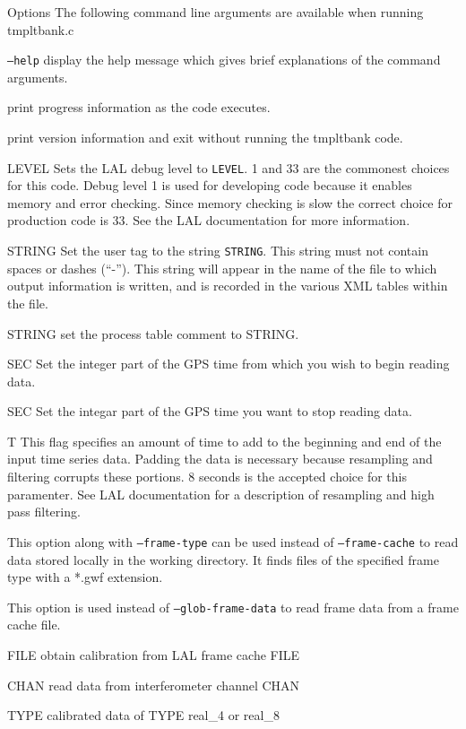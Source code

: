 \begin{entry}
\item[Options]
\noindent The following command line arguments are available when running tmpltbank.c
\\
\item[\texttt{--help}] display the help message which gives brief explanations
of the command arguments.  
\item[\option{--verbose}] print progress information as the code executes.
\item[\option{--version}] print version information and exit without running 
the tmpltbank code. 
\item[\option{--debug-level} \textsc{LEVEL}] Sets the LAL debug level to \texttt{LEVEL}.  
1 and 33 are the commonest choices for this code.  Debug level 1 is used for 
developing code because it enables memory and error checking.  Since memory 
checking is slow the correct choice for production code is 33.  
See the LAL documentation for more information.  
\item[\option{--user-tag} \textsc{STRING}] Set the user tag to the string \texttt{STRING}.  
This string must not contain spaces or dashes (``-'').  This string will appear 
in the name of the file to which output information is written, and is recorded 
in the various XML tables within the file.
\item[\option{--comment} \textsc{STRING}] set the process table comment to STRING.
\item[\option{--gps-start-time} \textsc{SEC}] Set the integer part of the GPS time from 
which you wish to begin reading data.
\item[\option{--gps-end-time} \textsc{SEC}] Set the integar part of the GPS time you want
to stop reading data. 
\item[\option{--pad-data} \textsc{T}] This flag specifies an amount of time to add to 
the beginning and end of the input time series data.  Padding the data is 
necessary because resampling and filtering corrupts these portions. 
8 seconds is the accepted choice for this paramenter.  See LAL documentation 
for a description of resampling and high pass filtering.  
\item[\option{--glob-frame-data}] This option along with \texttt{--frame-type}
can be used instead of \texttt{--frame-cache} to read data stored locally in 
the working directory.  It finds files of the specified frame type with a *.gwf 
extension. 
\item[\option{--frame-cache}] This option is used instead of 
\texttt{--glob-frame-data} to read frame data from a frame cache file. 
\item[\option{--calibration-cache} \textsc{FILE}] obtain calibration from LAL frame 
cache FILE
\item[\option{--channel-name} \textsc{CHAN}] read data from interferometer channel CHAN
\item[\option{--calibrated-data} \textsc{TYPE}] calibrated data of TYPE real\_4 or real\_8


\end{entry}
